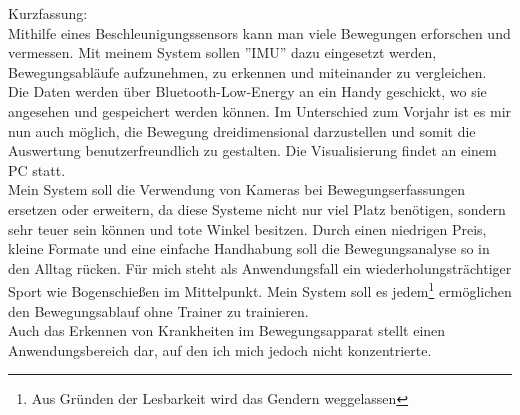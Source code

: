 Kurzfassung:\\
\small
Mithilfe eines Beschleunigungssensors kann man viele Bewegungen erforschen und vermessen. 
Mit meinem System sollen ''IMU'' dazu eingesetzt werden, Bewegungsabläufe aufzunehmen, zu erkennen und miteinander zu vergleichen.\\
Die Daten werden über Bluetooth-Low-Energy an ein Handy geschickt, wo sie angesehen und gespeichert 
werden können. Im Unterschied zum Vorjahr ist es mir nun auch möglich, die Bewegung dreidimensional 
darzustellen und somit die Auswertung benutzerfreundlich zu gestalten. Die Visualisierung findet an 
einem PC statt.\\
Mein System soll die Verwendung von Kameras bei Bewegungserfassungen ersetzen oder erweitern, da diese Systeme 
nicht nur viel Platz benötigen, sondern sehr teuer sein können und tote Winkel besitzen. 
Durch einen niedrigen Preis, kleine Formate und eine einfache Handhabung soll die Bewegungsanalyse 
so in den Alltag rücken. Für mich steht als Anwendungsfall ein wiederholungsträchtiger Sport wie 
Bogenschießen im Mittelpunkt. Mein System soll es jedem\footnote{Aus Gründen der Lesbarkeit wird das Gendern weggelassen} 
ermöglichen den Bewegungsablauf ohne Trainer zu trainieren.\\
Auch das Erkennen von Krankheiten im Bewegungsapparat stellt einen Anwendungsbereich dar, auf den ich mich jedoch nicht konzentrierte.